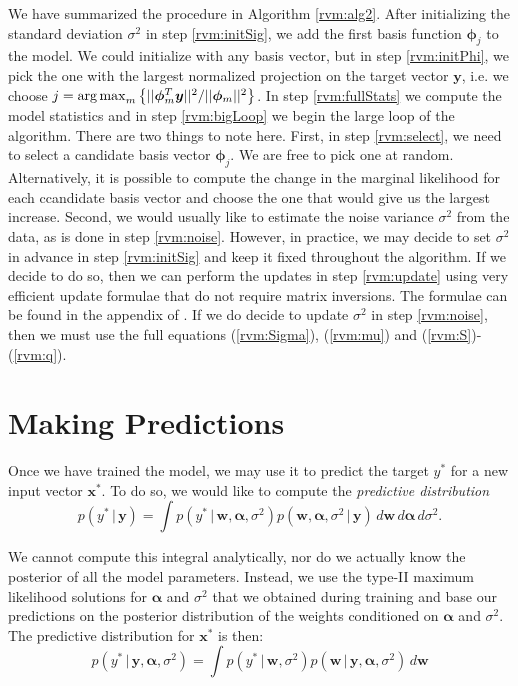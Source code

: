 We have summarized the procedure in Algorithm \ref{rvm:alg2}.
After initializing the standard deviation $\sigma^2$ in step \ref{rvm:initSig}, we add the first basis function $\bm\phi_j$ to the model. 
We could initialize with any basis vector, but in step \ref{rvm:initPhi}, we pick the one with the largest normalized projection on the target vector $\bm y$, i.e. we choose  $j = \operatorname*{arg\,max}_m \left\{||\bm\phi_m^T\bm y||^2/||\bm\phi_m||^2\right\}$.
In step \ref{rvm:fullStats} we compute the model statistics and in step \ref{rvm:bigLoop} we begin the large loop of the algorithm.
There are two things to note here. 
First, in step \ref{rvm:select}, we need to select a candidate basis vector $\bm\phi_j$. 
We are free to pick one at random. 
Alternatively, it is possible to compute the change in the marginal likelihood for each ccandidate basis vector and choose the one that would give us the largest increase.
Second, we would usually like to estimate the noise variance $\sigma^2$ from the data, as is done in step \ref{rvm:noise}.
However, in practice, we may decide to set $\sigma^2$ in advance in step \ref{rvm:initSig} and keep it fixed throughout the algorithm.
If we decide to do so, then we can perform the updates in step \ref{rvm:update} using very efficient update formulae that do not require matrix inversions.
The formulae can be found in the appendix of \cite{tipping2003}.
If we do decide to update $\sigma^2$ in step \ref{rvm:noise}, then we must use the full equations (\ref{rvm:Sigma}), (\ref{rvm:mu}) and (\ref{rvm:S})-(\ref{rvm:q}).


\section{Making Predictions}
Once we have trained the model, we may use it to predict the target $y^*$ for a new input vector $\bm x^*$.
To do so, we would like to compute the \emph{predictive distribution}
\begin{equation*}
  p(y^*\,|\,\bm y) = \int p(y^*\,|\,\bm w, \bm\alpha,\sigma^2) p(\bm w,\bm\alpha,\sigma^2\,|\,\bm y)\,d\bm w \,d\bm\alpha \,d\sigma^2.
\end{equation*}

We cannot compute this integral analytically, nor do we actually know the posterior of all the model parameters.
Instead, we use the type-II maximum likelihood solutions for $\bm\alpha$ and $\sigma^2$ that we obtained during training and base our predictions on the posterior distribution of the weights conditioned on $\bm\alpha$ and $\sigma^2$. 
The predictive distribution for $\bm x^*$ is then:
\begin{equation}
  \label{rvm:predictive}
  p(y^*\,|\,\bm y,\bm\alpha, \sigma^2) = \int p(y^*\,|\,\bm w, \sigma^2) p(\bm w\,|\,\bm y,\bm\alpha,\sigma^2)\,d\bm w
\end{equation}

